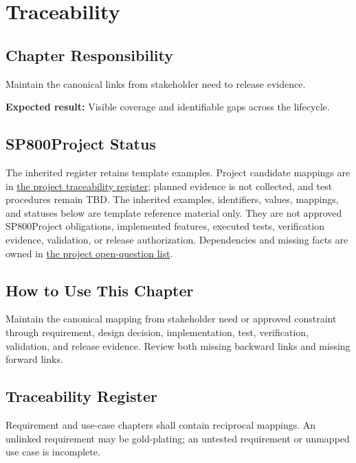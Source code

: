 \chapter{Traceability}
\section{Chapter Responsibility}
\label{Section:TraceabilityResponsibility}
Maintain the canonical links from stakeholder need to release evidence.

\noindent\textbf{Expected result:} Visible coverage and identifiable gaps across the lifecycle.

\section{SP800Project Status}
\label{Section:SP800StatusTraceability}
The inherited register retains template examples. Project candidate mappings
are in \hyperref[Table:ProjectTraceabilityRegister]{the project traceability register};
planned evidence is not collected, and test procedures remain TBD. The inherited examples,
identifiers, values, mappings, and statuses below are template reference
material only. They are not approved SP800Project obligations, implemented features,
executed tests, verification evidence, validation, or release authorization.
Dependencies and missing facts are owned in
\hyperref[Section:SP800OpenQuestions]{the project open-question list}.

\section{How to Use This Chapter}
Maintain the canonical mapping from stakeholder need or approved constraint through requirement, design decision, implementation, test, verification, validation, and release evidence. Review both missing backward links and missing forward links.
\section{Traceability Register}
Requirement and use-case chapters shall contain reciprocal mappings. An
unlinked requirement may be gold-plating; an untested requirement or unmapped
use case is incomplete.

